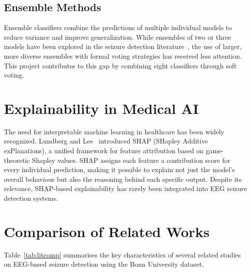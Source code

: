 \subsection{Ensemble Methods}

Ensemble classifiers combine the predictions of multiple individual models to reduce variance and improve generalization. While ensembles of two or three models have been explored in the seizure detection literature~\citep{subasi2019epileptic}, the use of larger, more diverse ensembles with formal voting strategies has received less attention. This project contributes to this gap by combining eight classifiers through soft voting.

\section{Explainability in Medical AI}

The need for interpretable machine learning in healthcare has been widely recognized. Lundberg and Lee~\citep{lundberg2017unified} introduced SHAP (SHapley Additive exPlanations), a unified framework for feature attribution based on game-theoretic Shapley values. SHAP assigns each feature a contribution score for every individual prediction, making it possible to explain not just the model's overall behaviour but also the reasoning behind each specific output. Despite its relevance, SHAP-based explainability has rarely been integrated into EEG seizure detection systems.

\section{Comparison of Related Works}

Table~\ref{tab:litcomp} summarises the key characteristics of several related studies on EEG-based seizure detection using the Bonn University dataset.

